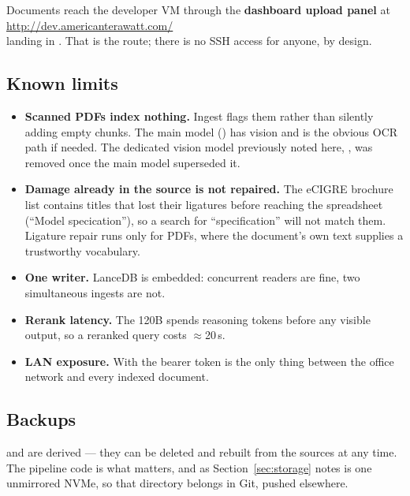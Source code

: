 \begin{sloppypar}
Documents reach the developer VM through the \textbf{dashboard upload panel} at\\
\hspace*{2em} \url{http://dev.americanterawatt.com/}\\ 
landing in . That is the route; there is no SSH access for anyone, by design.
\end{sloppypar}

\subsection{Known limits}

\begin{itemize}\itemsep1pt
  \item \textbf{Scanned PDFs index nothing.} Ingest flags them rather than
        silently adding empty chunks. The main model
        () has vision and is the obvious OCR path if
        needed. The dedicated vision model previously noted here,
        , was removed once the main model superseded it.
  \item \textbf{Damage already in the source is not repaired.} The eCIGRE
        brochure list contains titles that lost their ligatures before reaching
        the spreadsheet (``Model specication''), so a search for
        ``specification'' will not match them. Ligature repair runs only for
        PDFs, where the document's own text supplies a trustworthy vocabulary.
  \item \textbf{One writer.} LanceDB is embedded: concurrent readers are fine,
        two simultaneous ingests are not.
  \item \textbf{Rerank latency.} The 120B spends reasoning tokens before any
        visible output, so a reranked query costs $\approx$20\,s.
  \item \textbf{LAN exposure.} With  the bearer token is
        the only thing between the office network and every indexed document.
\end{itemize}

\subsection{Backups}
 and  are derived --- they can be deleted and rebuilt from
the sources at any time. The pipeline code is what matters, and as
Section~\ref{sec:storage} notes  is one unmirrored NVMe, so that
directory belongs in Git, pushed elsewhere.

